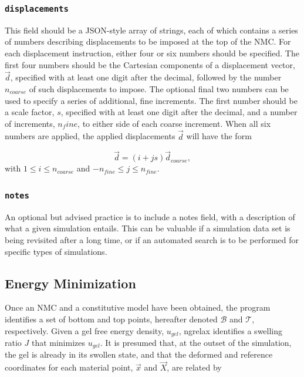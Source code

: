 \documentclass{article}
\begin{document}
\subsubsection*{\texttt{displacements}}

This field should be a JSON-style array of strings, each of which contains a
series of numbers describing displacements to be imposed at the top of the NMC.
For each displacement instruction, either four or six numbers should be
specified. The first four numbers should be the Cartesian components of a
displacement vector, $\vec{d}$, specified with at least one digit after the
decimal,  followed by the number $n_{coarse}$ of such displacements to impose.
The optional final two numbers can be used to specify a series of additional,
fine increments. The  first number should be a scale factor, $s$, specified with
at least one digit after the decimal, and a number of increments, $n_fine$, to
either side of each coarse increment. When all six numbers are applied, the
applied displacements $\vec{d}$ will have the form

\begin{equation}
\vec{d} = \left(i + js\right) \vec{d}_{coarse},
\end{equation}
with $1 \leq i \leq n_{coarse}$ and $-n_{fine} \leq j \leq n_{fine}$.

\subsubsection*{\texttt{notes}}
An optional but advised practice is to include a notes field, with a description
of what a given simulation entails. This can be valuable if a simulation
data set is being revisited after a long time, or if an automated search is to
be performed for specific types of simulations.

\subsection{Energy Minimization}

Once an NMC and a constitutive model have been obtained, the program identifies
a set of bottom and top points, hereafter denoted $\mathbf{\mathcal{B}}$ and
$\mathbf{\mathcal{T}}$, respectively. Given a gel free energy density, 
$u_{gel}$, ngrelax identifies a swelling ratio $J$ that minimizes $u_{gel}$.
It is presumed that, at the outset of the simulation, the gel is already in its
swollen state, and that the deformed and reference coordinates for each material
point, $\vec{x}$ and $\vec{X}$, are related by
\end{document}
